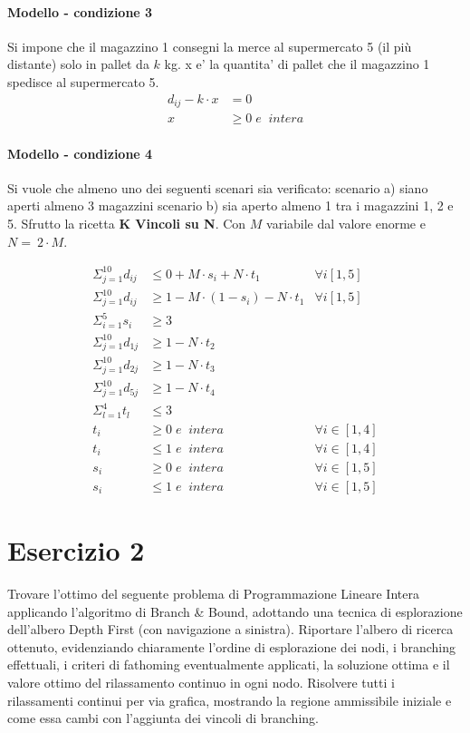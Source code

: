\documentclass[a4paper,12pt,oneside]{article}
\begin{document}
\paragraph{Modello - condizione 3}
Si impone che il magazzino 1 consegni la merce al supermercato 5 (il più distante) solo in pallet da $k$ kg.
x e' la quantita' di pallet che il magazzino 1 spedisce al supermercato 5.
\begin{align*}
  d_{ij} - k \cdot x &= 0 \\
  x &\geq 0 \; e \;\; intera
\end{align*}

\paragraph{Modello - condizione 4}
Si vuole che almeno uno dei seguenti scenari sia verificato: scenario a) siano aperti almeno 3 magazzini scenario b) sia aperto almeno 1 tra i magazzini 1, 2 e 5. Sfrutto la ricetta \textbf{K Vincoli su N}.
Con $M$ variabile dal valore enorme e $N = ~ 2 \cdot M$.

\begin{align*}
  \Sigma ^ {10} _ {j=1} d_{ij} &\leq 0 + M \cdot s_i + N \cdot t_1 & \forall i [1,5] \\
  \Sigma ^ {10} _ {j=1} d_{ij} &\geq 1 - M \cdot (1 - s_i) - N \cdot t_1 & \forall i [1,5] \\
  \Sigma ^ {5} _ {i=1} s_i &\geq 3 \\
  \Sigma ^ {10} _ {j=1} d_{1j} &\geq 1 - N \cdot t_2 \\
  \Sigma ^ {10} _ {j=1} d_{2j} &\geq 1 - N \cdot t_3 \\
  \Sigma ^ {10} _ {j=1} d_{5j} &\geq 1 - N \cdot t_4 \\
  \Sigma ^ {4} _ {l=1} t_l &\leq 3 \\
  t_i &\geq 0 \; e \;\; intera & \forall i \in [1,4] \\
  t_i &\leq 1 \; e \;\; intera & \forall i \in [1,4] \\
  s_i &\geq 0 \; e \;\; intera & \forall i \in [1,5] \\
  s_i &\leq 1 \; e \;\; intera & \forall i \in [1,5]
\end{align*}

\newpage
\section{Esercizio 2}

Trovare l’ottimo del seguente problema di Programmazione Lineare Intera applicando l’algoritmo di Branch \& Bound, adottando una tecnica di esplorazione dell’albero Depth First (con navigazione a sinistra). Riportare l’albero di ricerca ottenuto, evidenziando chiaramente l’ordine di esplorazione dei nodi, i branching effettuali, i criteri di fathoming eventualmente applicati, la soluzione ottima e il valore ottimo del rilassamento continuo in ogni nodo. Risolvere tutti i rilassamenti continui per via grafica, mostrando la regione ammissibile iniziale e come essa cambi con l’aggiunta dei vincoli di branching.
\end{document}
